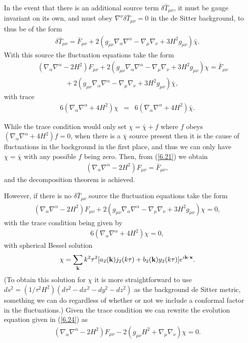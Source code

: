 In the event that there is an additional source term $\delta\bar{T}_{\mu\nu}$, it must be gauge invariant on its own, and must obey $\nabla^{\nu}\delta \bar{T}_{\mu\nu}=0$ in the de Sitter background, to thus be of the form 
%
\begin{eqnarray}
\delta \bar{T}_{\mu\nu}=\bar{F}_{\mu\nu}+2(g_{\mu\nu}\nabla_{\alpha}\nabla^{\alpha}-\nabla_{\mu}\nabla_{\nu}+3H^2g_{\mu\nu})\bar{\chi}.
\label{6.20}
\end{eqnarray}
% 
With this source the fluctuation equations take the form
%
\begin{eqnarray}
&&(\nabla_{\alpha}\nabla^{\alpha}-2H^2)F_{\mu\nu}+2(g_{\mu\nu}\nabla_{\alpha}\nabla^{\alpha}-\nabla_{\mu}\nabla_{\nu}+3H^2g_{\mu\nu})\chi=\bar{F}_{\mu\nu}
\nonumber\\
&&\qquad\qquad+2(g_{\mu\nu}\nabla_{\alpha}\nabla^{\alpha}-\nabla_{\mu}\nabla_{\nu}+3H^2g_{\mu\nu})\bar{\chi},
\label{6.21}
\end{eqnarray}
%
with trace
%
\begin{eqnarray}
6(\nabla_{\alpha}\nabla^{\alpha}+4H^2)\chi&=&6(\nabla_{\alpha}\nabla^{\alpha}+4H^2)\bar{\chi}.
\label{6.22}
\end{eqnarray}
% 

While the trace condition would only set $\chi=\bar{\chi}+f$ where $f$ obeys  $(\nabla_{\alpha}\nabla^{\alpha}+4H^2)f=0$, when there is a $\bar{\chi}$ source present then it is the cause of fluctuations in the background in the first place, and thus we can only have $\chi=\bar{\chi}$ with any possible $f$ being zero. Then, from  (\ref{6.21}) we obtain 
%
\begin{eqnarray}
(\nabla_{\alpha}\nabla^{\alpha}-2H^2)F_{\mu\nu}=\bar{F}_{\mu\nu},
\label{6.23}
\end{eqnarray}
%
and the decomposition theorem is achieved.

However, if there is no $\delta \bar{T}_{\mu\nu}$ source the fluctuation equations take the form 
%
\begin{eqnarray}
(\nabla_{\alpha}\nabla^{\alpha}-2H^2)F_{\mu\nu}+2(g_{\mu\nu}\nabla_{\alpha}\nabla^{\alpha}-\nabla_{\mu}\nabla_{\nu}+3H^2g_{\mu\nu})\chi=0,
\label{6.24}
\end{eqnarray}
%
with the trace condition  being given by 
%
\begin{eqnarray}
6(\nabla_{\alpha}\nabla^{\alpha}+4H^2)\chi=0,
\label{6.25a}
\end{eqnarray}
%
with spherical Bessel solution
%
\begin{eqnarray}
\chi=\sum_{\bf k} k^2\tau^2[a_2({\bf k})j_2(k\tau)+b_2 ({\bf k})y_2(k\tau)]e^{i{\bf k}\cdot {\bf x}}.
\label{6.26a}
\end{eqnarray}
%
(To obtain this solution for $\chi$ it is more straightforward to use $ds^2=(1/\tau^2 H^2)(d\tau^2-dx^2-dy^2-dz^2)$ as the background de Sitter metric, something we can do regardless of whether or not we include a conformal factor in the fluctuations.) Given the trace condition we can rewrite the evolution equation given in (\ref{6.24}) as 
%
\begin{eqnarray}
(\nabla_{\alpha}\nabla^{\alpha}-2H^2)F_{\mu\nu}-2(g_{\mu\nu}H^2+\nabla_{\mu}\nabla_{\nu})\chi=0.
\label{6.27a}
\end{eqnarray}
%


